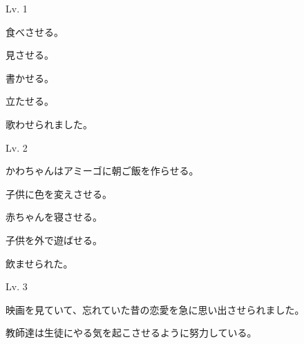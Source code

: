 
\author{Tomislav Mamić}

	
	\begin{mondai}{Lv. 1}
		\item 食べさせる。
		\item 見させる。
		\item 書かせる。
		\item 立たせる。
		\item 歌わせられました。
	\end{mondai}
	
	\begin{mondai}{Lv. 2}
		\item かわちゃんはアミーゴに朝ご飯を作らせる。
		\item 子供に色を変えさせる。
		\item 赤ちゃんを寝させる。
		\item 子供を外で遊ばせる。
		\item 飲ませられた。
	\end{mondai}
	
	\begin{mondai}{Lv. 3}
		\item 映画を見ていて、忘れていた昔の恋愛を急に思い出させられました。
		\item 教師達は生徒にやる気を起こさせるように努力している。
	\end{mondai}
